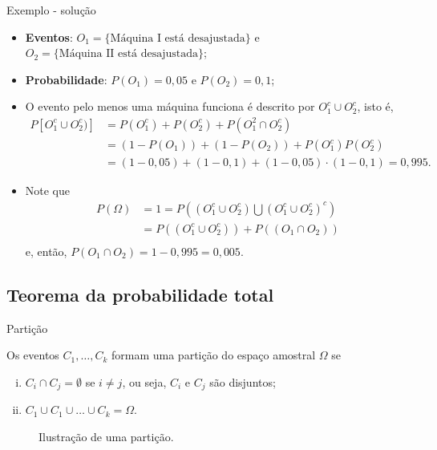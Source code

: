 \documentclass[9pt]{beamer}
\begin{document}
\begin{frame}{Exemplo - solução}
	\begin{itemize}
		\item \textbf{Eventos}: $O_1=\{\mbox{Máquina I está desajustada}\}$ e $O_2=\{\mbox{Máquina II está desajustada}\}$;
		\item \textbf{Probabilidade}: $P(O_1) = 0,05$ e $P(O_2) = 0,1$;
		\item O evento pelo menos uma máquina funciona é descrito por $O_1^c \cup O_2^c$, isto é,
		\begin{align*}
		P[O_1^c \cup O_2^c)] &= P(O_1^c ) + P (O_2^c) + P (O_1^2 \cap O_2^c) \\
		&= (1-P(O_1))  + (1-P( O_2)) + P(O_1^c) P(O_2^c) \\
		&=(1-0,05)  + (1-0,1) + (1-0,05) \cdot (1-0,1) = 0,995.
		\end{align*}
		\item Note que
		\begin{align*}
		P(\Omega) &= 1 =  P\left(\left( O_1^c \cup O_2^c \right)\bigcup \left(O_1^c \cup O_2^c\right)^c\right)\\
		&= P\left(\left( O_1^c \cup O_2^c \right)\right) + P\left(\left( O_1 \cap O_2 \right)\right)\\
		\end{align*}
		e, então, $P(O_1 \cap O_2) = 1 - 0,995 = 0,005$.
	\end{itemize}	
\end{frame}

\subsection{Teorema da probabilidade total}

\begin{frame}{Partição}


		Os eventos $C_1, \dots, C_k$ formam uma partição do espaço amostral $\Omega$ se 
		\begin{enumerate}[i.]
			\item $C_i \cap C_j= \emptyset$ se $i \neq j$, ou seja, $C_i$ e $C_j$ são disjuntos;
			\item $C_1 \cup C_1 \cup \dots \cup C_k  =  \Omega$.
		\end{enumerate}
		
	 \begin{figure}[htbp]
	 \caption{Ilustração de uma partição.}
	 \end{figure}
\end{frame}
\end{document}
